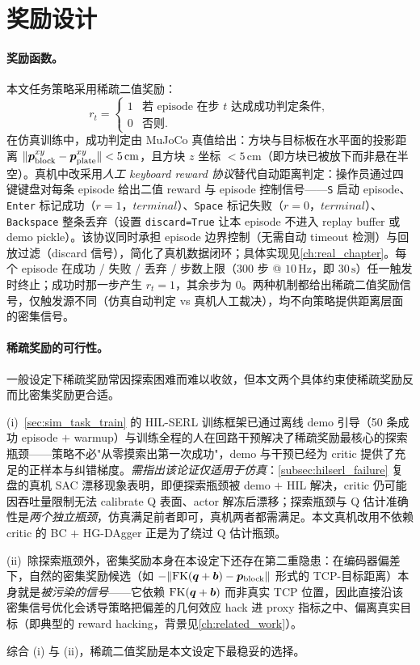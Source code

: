 \section{奖励设计}\label{sec:task_reward}

\paragraph{奖励函数。}本文任务策略采用稀疏二值奖励：
\begin{equation*}
  r_t = \begin{cases}
    1 & \text{若 episode 在步 $t$ 达成成功判定条件}, \\
    0 & \text{否则}.
  \end{cases}
\end{equation*}
在仿真训练中，成功判定由 MuJoCo 真值给出：方块与目标板在水平面的投影距离 $\lVert \bm{p}_\text{block}^{xy} - \bm{p}_\text{plate}^{xy}\rVert < 5\,\text{cm}$，且方块 $z$ 坐标 $< 5\,\text{cm}$（即方块已被放下而非悬在半空）。真机中改采用\emph{人工 keyboard reward 协议}替代自动距离判定：操作员通过四键键盘对每条 episode 给出二值 reward 与 episode 控制信号——\texttt{S} 启动 episode、\texttt{Enter} 标记成功（$r=1$，$\textit{terminal}$）、\texttt{Space} 标记失败（$r=0$，$\textit{terminal}$）、\texttt{Backspace} 整条丢弃（设置 \texttt{discard=True} 让本 episode 不进入 replay buffer 或 demo pickle）。该协议同时承担 episode 边界控制（无需自动 timeout 检测）与回放过滤（discard 信号），简化了真机数据闭环；具体实现见\cref{ch:real_chapter}。每个 episode 在成功 / 失败 / 丢弃 / 步数上限（$300$ 步 @ $10\,\text{Hz}$，即 $30\,\text{s}$）任一触发时终止；成功时那一步产生 $r_t = 1$，其余步为 $0$。两种机制都给出稀疏二值奖励信号，仅触发源不同（仿真自动判定 vs 真机人工裁决），均不向策略提供距离层面的密集信号。

\paragraph{稀疏奖励的可行性。}一般设定下稀疏奖励常因探索困难而难以收敛，但本文两个具体约束使稀疏奖励反而比密集奖励更合适。

(i)~\cref{sec:sim_task_train} 的 HIL-SERL 训练框架已通过离线 demo 引导（50 条成功 episode $+$ warmup）与训练全程的人在回路干预解决了稀疏奖励最核心的探索瓶颈——策略不必"从零摸索出第一次成功"，demo 与干预已经为 critic 提供了充足的正样本与纠错梯度。\emph{需指出该论证仅适用于仿真}：\cref{subsec:hilserl_failure} 复盘的真机 SAC 漂移现象表明，即便探索瓶颈被 demo $+$ HIL 解决，critic 仍可能因吞吐量限制无法 calibrate Q 表面、actor 解冻后漂移；探索瓶颈与 Q 估计准确性是\emph{两个独立瓶颈}，仿真满足前者即可，真机两者都需满足。本文真机改用不依赖 critic 的 BC $+$ HG-DAgger 正是为了绕过 Q 估计瓶颈。

(ii)~除探索瓶颈外，密集奖励本身在本设定下还存在第二重隐患：在编码器偏差下，自然的密集奖励候选（如 $-\lVert\text{FK}(\bm{q}+\bm{b}) - \bm{p}_\text{block}\rVert$ 形式的 TCP-目标距离）本身就是\emph{被污染的信号}——它依赖 $\text{FK}(\bm{q}+\bm{b})$ 而非真实 TCP 位置，因此直接沿该密集信号优化会诱导策略把偏差的几何效应 hack 进 proxy 指标之中、偏离真实目标（即典型的 reward hacking，背景见\cref{ch:related_work}）。

综合 (i) 与 (ii)，稀疏二值奖励是本文设定下最稳妥的选择。
